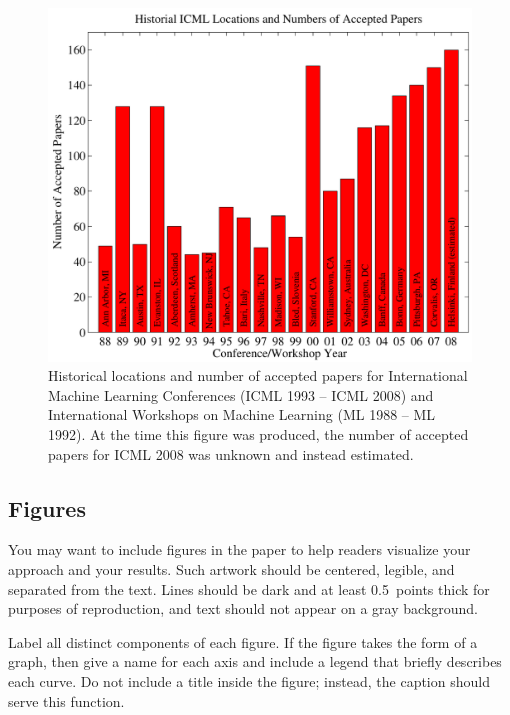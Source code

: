 \documentclass{article}
\begin{document}
\begin{figure}[ht]
\vskip 0.2in
\begin{center}
\centerline{\includegraphics[width=\columnwidth]{icml_numpapers}}
\caption{Historical locations and number of accepted papers for International
  Machine Learning Conferences (ICML 1993 -- ICML 2008) and
  International Workshops on Machine Learning (ML 1988 -- ML
  1992). At the time this figure was produced, the number of
  accepted papers for ICML 2008 was unknown and instead estimated.}
\label{icml-historical}
\end{center}
\vskip -0.2in
\end{figure} 

\subsection{Figures}
 
You may want to include figures in the paper to help readers visualize
your approach and your results. Such artwork should be centered,
legible, and separated from the text. Lines should be dark and at
least 0.5~points thick for purposes of reproduction, and text should
not appear on a gray background.

Label all distinct components of each figure. If the figure takes the
form of a graph, then give a name for each axis and include a legend
that briefly describes each curve. Do not include a title inside the
figure; instead, the caption should serve this function.
\end{document}
